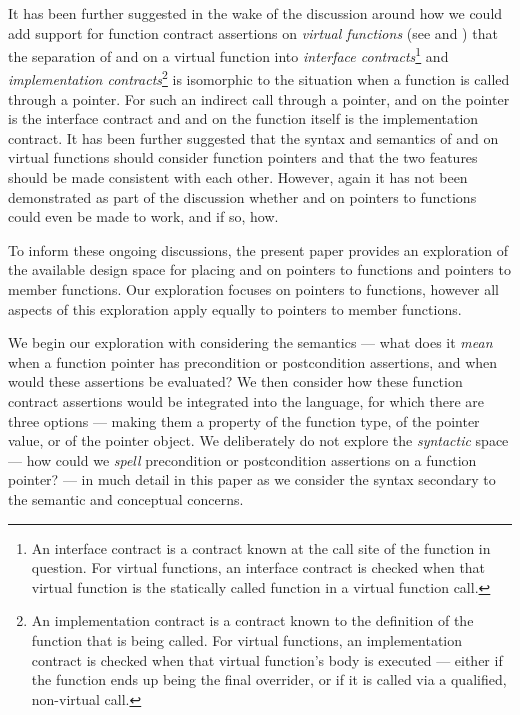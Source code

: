 It has been further suggested in the wake of the discussion around how we could add support for function contract assertions on \emph{virtual functions} (see \cite{P3097R0} and \cite{P3165R0}) that the separation of  and  on a virtual function into \emph{interface contracts}\footnote{An interface contract is a contract known at the call site of the function in question. For virtual functions, an interface contract is checked when that virtual function is the statically called function in a virtual function call.} and \emph{implementation contracts}\footnote{An implementation contract is a contract known to the definition of the function that is being called. For virtual functions, an implementation contract is checked when that virtual function's body is executed --- either if the function ends up being the final overrider, or if it is called via a qualified, non-virtual call.} is isomorphic to the situation when a function is called through a pointer. For such an indirect call through a pointer,  and  on the pointer is the interface contract and  and  on the function itself is the implementation contract. It has been further suggested that the syntax and semantics of  and  on virtual functions should consider function pointers and that the two features should be made consistent with each other. However, again it has not been demonstrated as part of the discussion whether  and  on pointers to functions could even be made to work, and if so, how.

To inform these ongoing discussions, the present paper provides an exploration of the available design space for placing  and  on pointers to functions and pointers to member functions. Our exploration focuses on pointers to functions, however all aspects of this exploration apply equally to pointers to member functions.

We begin our exploration with considering the semantics --- what does it \emph{mean} when a function pointer has precondition or postcondition assertions, and when would these assertions be evaluated? We then consider how these function contract assertions would be integrated into the language, for which there are three options --- making them a property of the function type, of the pointer value, or of the pointer object. We deliberately do not explore the \emph{syntactic} space --- how could we \emph{spell} precondition or postcondition assertions on a function pointer? --- in much detail in this paper as we consider the syntax secondary to the semantic and conceptual concerns. 

